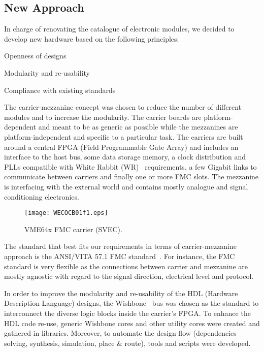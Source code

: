 \documentclass{JAC2003}
\begin{document}
\subsection{New Approach}
In charge of renovating the catalogue of electronic modules, we decided to develop new hardware based on the following principles:
\begin{Itemize}
\item Openness of designs
\item Modularity and re-usability
\item Compliance with existing standards
\end{Itemize}

The carrier-mezzanine concept was chosen to reduce the number of different modules and to increase the modularity.
The carrier boards are platform-dependent and meant to be as generic as possible while the mezzanines are platform-independent and specific to a particular task.
The carriers are built around a central FPGA (Field Programmable Gate Array) and includes an interface to the host bus, some data storage memory, a clock distribution and PLLs compatible with White Rabbit (WR)~\cite{wr} requirements, a few Gigabit links to communicate between carriers and finally one or more FMC slots.
The mezzanine is interfacing with the external world and contains mostly analogue and signal conditioning electronics.

\begin{figure}[htb]
   \centering
   \texttt{[image: WECOCB01f1.eps]}
   \caption{VME64x FMC carrier (SVEC).}
   \label{svec}
\end{figure}

The standard that best fits our requirements in terms of carrier-mezzanine approach is the ANSI/VITA 57.1 FMC standard~\cite{fmc}.
For instance, the FMC standard is very flexible as the connections between carrier and mezzanine are mostly agnostic with regard to the signal direction, electrical level and protocol.

In order to improve the modularity and re-usability of the HDL (Hardware Description Language) designs, the Wishbone~\cite{wishbone} bus was chosen as the standard to interconnect the diverse logic blocks inside the carrier's FPGA.
To enhance the HDL code re-use, generic Wishbone cores and other utility cores were created and gathered in libraries.
Moreover, to automate the design flow (dependencies solving, synthesis, simulation, place \& route), tools and scripts were developed.
\end{document}
